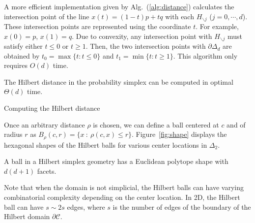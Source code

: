 \documentclass[graybox]{svmult}
\def\calC{\mathcal{C}}
\begin{document}
A more efficient implementation given by Alg.~(\ref{alg:distance}) calculates
the intersection point of the line $x(t)=(1-t)p+tq$ with each $H_{\backslash{}j}$ ($j=0,\cdots,d$).
These intersection points are represented using the coordinate $t$.
For example, $x(0)=p$, $x(1)=q$. Due to convexity,
any intersection point with $H_{\backslash{}j}$ must satisfy either $t\le0$ or $t\ge1$.
Then, the two intersection points with $\partial\Delta_d$ are obtained by 
$t_0=\max\{t:t\le0\}$ and $t_1=\min\{t:t\ge1\}$.
This algorithm only requires $O(d)$ time.

\begin{lemma}
The Hilbert distance in the probability simplex can be computed in optimal $\Theta(d)$ time.
\end{lemma}

\begin{algorithm}[t]
\caption{Computing the Hilbert distance}\label{alg:distance}
\end{algorithm}

Once an arbitrary distance $\rho$ is chosen, we can define a ball centered at $c$ and of radius $r$ as $B_\rho(c,r)=\{x\ :\ \rho(c,x)\leq r\}$.
Figure~\ref{fig:shape} displays the hexagonal shapes of the Hilbert balls for various center locations in $\Delta_2$.

\begin{theorem}
A ball in a Hilbert simplex geometry has a Euclidean polytope shape with $d(d+1)$ facets.
\end{theorem}
Note that when the domain is not simplicial, the Hilbert balls can have varying combinatorial complexity depending on the center location.
In 2D, the Hilbert ball can have $s\sim{}2s$ edges, where $s$ is the number of edges of the boundary of the Hilbert domain $\partial\calC$.
\end{document}

